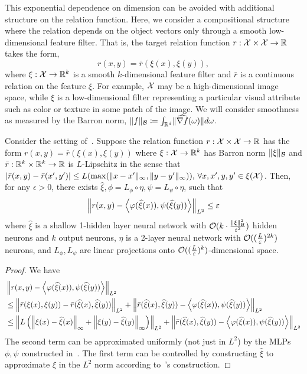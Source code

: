 This exponential dependence on dimension can be avoided with additional structure on the relation function. Here, we consider a compositional structure where the relation depends on the object vectors only through a smooth low-dimensional feature filter. That is, the target relation function $r: {\mathcal{X}} \times {\mathcal{X}} \to \mathbb{R}$ takes the form,
\begin{equation*}
    r(x, y) = \bar{r}(\xi(x), \xi(y)),
\end{equation*}
where $\xi : {\mathcal{X}} \to \mathbb{R}^k$ is a smooth $k$-dimensional feature filter and $\bar{r}$ is a continuous relation on the feature $\xi$. For example, ${\mathcal{X}}$ may be a high-dimensional image space, while $\xi$ is a low-dimensional filter representing a particular visual attribute such as color or texture in some patch of the image. We will consider smoothness as measured by the Barron norm, $\lVert f\rVert_{{\mathcal{B}}} \coloneq \int_{\mathbb{R}^d} \lVert\widehat{\nabla f}(\omega)\rVert d\omega$.

\begin{corollary}
    Consider the setting of~. Suppose the relation function $r: {\mathcal{X}} \times {\mathcal{X}} \to \mathbb{R}$ has the form $r(x, y) = \bar{r}(\xi(x), \xi(y))$ where $\xi: {\mathcal{X}} \to \mathbb{R}^k$ has Barron norm $\lVert\xi\rVert_{\mathcal{B}}$ and $\bar{r}: \mathbb{R}^k \times \mathbb{R}^k \to \mathbb{R}$ is $L$-Lipschitz in the sense that $\lvert\bar{r}(x, y) - \bar{r}(x', y')\rvert \leq L (\max(\lVert x - x'\rVert_\infty, \lVert y - y'\rVert_\infty)), \, \forall x,x',y,y' \in \xi({\mathcal{X}})$. Then, for any $\epsilon > 0$, there exists $\hat{\xi}, \phi = L_\phi \circ \eta, \psi = L_\psi \circ \eta$, such that
    \[\left\lVert r(x, y) - \left \langle \varphi(\widehat{\xi}(x)), \psi(\widehat{\xi}(y)) \right\rangle\right\rVert_{L^2} \leq \varepsilon\]
    where $\hat{\xi}$ is a shallow 1-hidden layer neural network with ${\mathcal{O}}(k \cdot \frac{\lVert\xi\rVert_{{\mathcal{B}}}^2}{\varepsilon^2})$ hidden neurons and $k$ output neurons, $\eta$ is a 2-layer neural network with ${\mathcal{O}}((\frac{L}{\varepsilon})^{2 k})$ neurons, and $L_\phi, L_\psi$ are linear projections onto ${\mathcal{O}}((\frac{L}{\varepsilon})^{k})$-dimensional space.
\end{corollary}
\begin{proof}
    We have
    \begin{align*}
        &\norm{r(x, y) - \iprod{\phi(\hat{\xi}(x))}{\psi(\hat{\xi}(y))}}_{L^2} \\
        &\leq \norm{\bar{r}(\xi(x), \xi(y)) - \bar{r}(\hat{\xi}(x), \hat{\xi}(y))}_{L^2} + \norm{\bar{r}(\hat{\xi}(x), \hat{\xi}(y)) - \iprod{\phi(\hat{\xi}(x))}{\psi(\hat{\xi}(y))}}_{L^2} \\
        &\leq \norm{L \paren{\infnorm{\xi(x) - \hat{\xi}(x)} + \infnorm{\xi(y) - \hat{\xi}(y)}}}_{L^2} + \norm{\bar{r}(\hat{\xi}(x), \hat{\xi}(y)) - \iprod{\phi(\hat{\xi}(x))}{\psi(\hat{\xi}(y))}}_{L^2}
    \end{align*}
    The second term can be approximated uniformly (not just in $L^2$) by the MLPs $\phi, \psi$ constructed in~. The first term can be controlled by constructing $\hat{\xi}$ to approximate $\xi$ in the $L^2$ norm according to~\textcite{barronUniversalApproximation1993}'s construction.
\end{proof}

